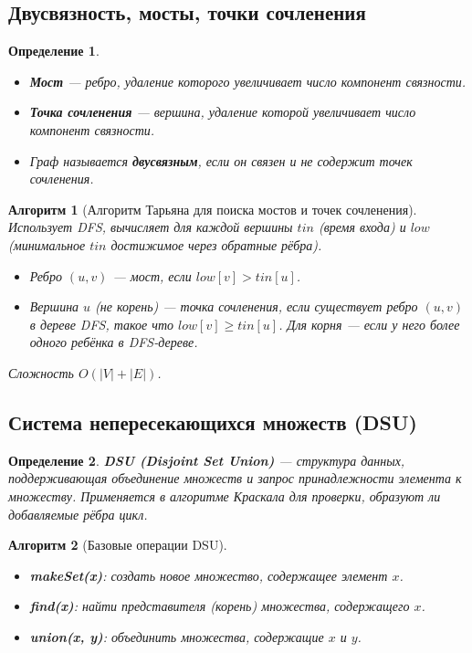 \documentclass[12pt]{article}
\newtheorem{definition}{Определение}
\newtheorem{algorithm}{Алгоритм}
\begin{document}
\begin{enumerate}
\subsection{Двусвязность, мосты, точки сочленения}
\begin{definition}
    \begin{itemize}
        \item \textbf{Мост} — ребро, удаление которого увеличивает число компонент связности.
        \item \textbf{Точка сочленения} — вершина, удаление которой увеличивает число компонент связности.
        \item Граф называется \textbf{двусвязным}, если он связен и не содержит точек сочленения.
    \end{itemize}
\end{definition}
\begin{algorithm}[Алгоритм Тарьяна для поиска мостов и точек сочленения]
    Использует DFS, вычисляет для каждой вершины \(tin\) (время входа) и \(low\) (минимальное \(tin\) достижимое через обратные рёбра). 
    \begin{itemize}
        \item Ребро \((u,v)\) — мост, если \(low[v] > tin[u]\).
        \item Вершина \(u\) (не корень) — точка сочленения, если существует ребро \((u,v)\) в дереве DFS, такое что \(low[v] \ge tin[u]\). Для корня — если у него более одного ребёнка в DFS-дереве.
    \end{itemize}
    Сложность \(O(|V|+|E|)\).
\end{algorithm}

\subsection{Система непересекающихся множеств (DSU)}
\begin{definition}
    \textbf{DSU (Disjoint Set Union)} — структура данных, поддерживающая объединение множеств и запрос принадлежности элемента к множеству. Применяется в алгоритме Краскала для проверки, образуют ли добавляемые рёбра цикл.
\end{definition}

\begin{algorithm}[Базовые операции DSU]
    \begin{itemize}
        \item \textbf{makeSet(x)}: создать новое множество, содержащее элемент \(x\).
        \item \textbf{find(x)}: найти представителя (корень) множества, содержащего \(x\).
        \item \textbf{union(x, y)}: объединить множества, содержащие \(x\) и \(y\).
    \end{itemize}
\end{algorithm}


\end{enumerate}
\end{document}
